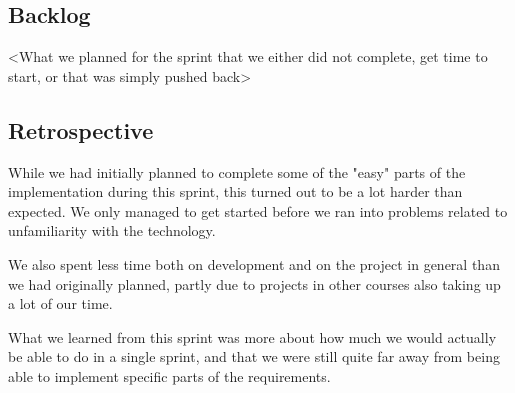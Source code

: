 \subsection{Backlog}
<What we planned for the sprint that we either did not complete, get time to start, or that was simply pushed back>

\subsection{Retrospective}
While we had initially planned to complete some of the "easy" parts of the implementation during this sprint, this turned out to be a lot harder than expected. We only managed to get started before we ran into problems related to unfamiliarity with the technology.

We also spent less time both on development and on the project in general than we had originally planned, partly due to projects in other courses also taking up a lot of our time.

What we learned from this sprint was more about how much we would actually be able to do in a single sprint, and that we were still quite far away from being able to implement specific parts of the requirements.

